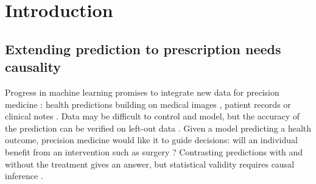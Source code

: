 \documentclass[11pt]{article}
\let\cite=\supercite
\begin{document}
\section{Introduction}\label{sec:intro}

\subsection{Extending prediction to prescription needs causality}

Progress in machine learning promises to integrate new data for
precision medicine \cite{beam2018big,rajkomar2019machine}:
health predictions building on medical images
\cite{khojaste2022deep,zhang2019radiological,yala2019deep,shen2019deep,nassif2022breast},
patient records
\cite{mooney2018bigdata,desai2020comparison,simon2018predicting} or clinical
notes \cite{horng2017creating,wang2020prediction,spasic2020clinical}. Data may
be difficult to control and model, but the accuracy of the prediction can be
verified on left-out data
\cite{altman2009prognosis,poldrack2020establishment,varoquaux2022evaluating}.
Given a model predicting a health outcome, precision medicine would like it to
guide decisions: will an individual benefit from an intervention such as surgery
\cite{fontana2019can}? Contrasting predictions with and without the treatment
gives an answer, but statistical validity requires causal inference
\cite{snowden_implementation_2011,sperrin2019explicit,blakely2020reflection}.


\end{document}
